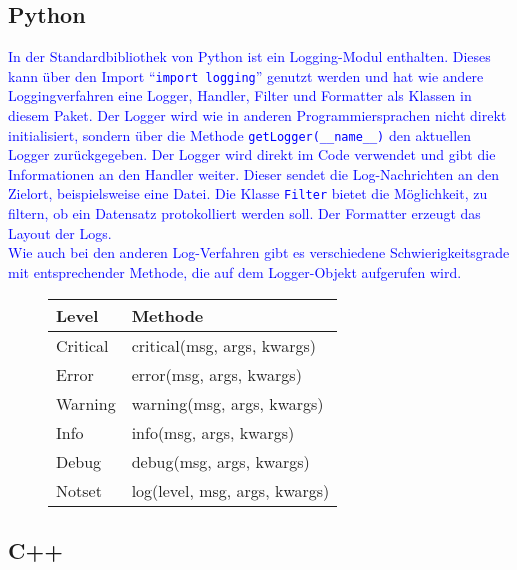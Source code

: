 \subsection{Python}\label{subsec:python}
\textcolor{blue}{
    In der Standardbibliothek von Python ist ein Logging-Modul enthalten.
    Dieses kann über den Import \enquote{\texttt{import logging}} genutzt werden und hat wie andere Loggingverfahren eine Logger, Handler, Filter und Formatter als Klassen in diesem Paket.
    Der Logger wird wie in anderen Programmiersprachen nicht direkt initialisiert, sondern über die Methode \texttt{getLogger(\_\_name\_\_)} den aktuellen Logger zurückgegeben.
    Der Logger wird direkt im Code verwendet und gibt die Informationen an den Handler weiter.
    Dieser sendet die Log-Nachrichten an den Zielort, beispielsweise eine Datei.
    Die Klasse \texttt{Filter} bietet die Möglichkeit, zu filtern, ob ein Datensatz protokolliert werden soll.
    Der Formatter erzeugt das Layout der Logs.
    \\
    Wie auch bei den anderen Log-Verfahren gibt es verschiedene Schwierigkeitsgrade mit entsprechender Methode, die auf dem Logger-Objekt aufgerufen wird.
    \\
    \begin{figure}[h]
        \centering
        \begin{tabular}[h]{|l|l|}
            \rowcolor{gray!50}
            \hline
            Level    & Methode                       \\
            \hline
            Critical & critical(msg, args, kwargs)   \\
            \hline
            Error    & error(msg, args, kwargs)      \\
            \hline
            Warning  & warning(msg, args, kwargs)    \\
            \hline
            Info     & info(msg, args, kwargs)       \\
            \hline
            Debug    & debug(msg, args, kwargs)      \\
            \hline
            Notset   & log(level, msg, args, kwargs) \\
            \hline
        \end{tabular}\label{fig:figure2}
    \end{figure}
}

\subsection{C++}\label{subsec:c++}



